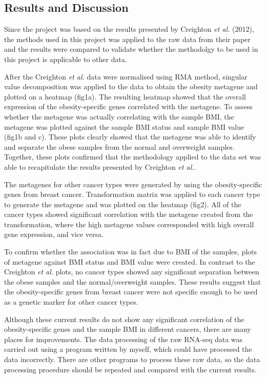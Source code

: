 \documentclass[12pt, a4paper]{article}
\begin{document}

\subsection*{Results and Discussion}

Since the project was based on the results presented by Creighton \textit{et al.} (2012), the methods used in this project was applied to the raw data from their paper and the results were compared to validate whether the methodolgy to be used in this project is applicable to other data.

After the Creighton \textit{et al.} data were normalised using RMA method, singular value decomposition was applied to the data to obtain the obesity metagene and plotted on a heatmap (fig1a).
The resulting heatmap showed that the overall expression of the obesity-specific genes correlated with the metagene.
To assess whether the metagene was actually correlating with the sample BMI, the metagene was plotted against the sample BMI status and sample BMI value (fig1b and c).
These plots clearly showed that the metagene was able to identify and separate the obese samples from the normal and overweight samples.
Together, these plots confirmed that the methodology applied to the data set was able to recapitulate the results presented by Creighton \textit{et al.}.

The metagenes for other cancer types were generated by using the obesity-specific genes from breast cancer.
Transformation matrix was applied to each cancer type to generate the metagene and was plotted on the heatmap (fig2).
All of the cancer types showed significant correlation with the metagene created from the transformation, where the high metagene values corresponded with high overall gene expression, and vice versa.

To confirm whether the association was in fact due to BMI of the samples, plots of metagene against BMI status and BMI value were created.
In contrast to the Creighton \textit{et al.} plots, no cancer types showed any significant separation between the obese samples and the normal/overweight samples.
These results suggest that the obesity-specific genes from breast cancer were not specific enough to be used as a genetic marker for other cancer types.

Although these current results do not show any significant correlation of the obesity-specific genes and the sample BMI in different cancers, there are many places for improvements.
The data processing of the raw RNA-seq data was carried out using a program written by myself, which could have processed the data incorrectly.
There are other programs to process these raw data, so the data processing procedure should be repeated and compared with the current results.
\end{document}
